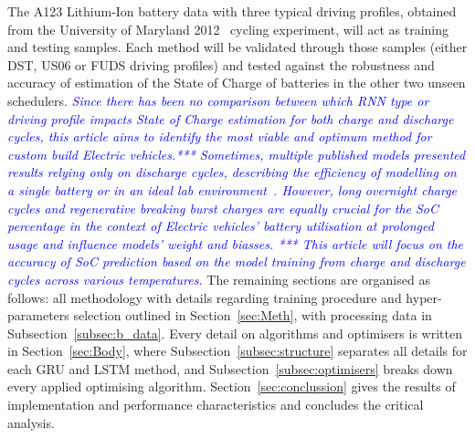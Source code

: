 The A123 Lithium-Ion battery data with three typical driving profiles, obtained from the University of Maryland 2012~\cite{noauthor_calce_2017} cycling experiment, will act as training and testing samples.
Each method will be validated through those samples (either DST, US06 or FUDS driving profiles) and tested against the robustness and accuracy of estimation of the State of Charge of batteries in the other two unseen schedulers.
\textcolor{blue}{\textit{
Since there has been no comparison between which RNN type or driving profile impacts State of Charge estimation for both charge and discharge cycles, this article aims to identify the most viable and optimum method for custom build Electric vehicles.***
Sometimes, multiple published models presented results relying only on discharge cycles, describing the efficiency of modelling on a single battery or in an ideal lab environment~\cite{xia_state_2018,javid_adaptive_2020,jiao_gru-rnn_2020,mamo_long_2020,zhang_deep_2020}.
However, long overnight charge cycles and regenerative breaking burst charges are equally crucial for the SoC percentage in the context of Electric vehicles' battery utilisation at prolonged usage and influence models' weight and biasses. ***
This article will focus on the accuracy of SoC prediction based on the model training from charge and discharge cycles across various temperatures.
}}
%
%
The remaining sections are organised as follows: all methodology with details regarding training procedure and hyper-parameters selection outlined in Section~\ref{sec:Meth}, with processing data in Subsection~\ref{subsec:b_data}.
Every detail on algorithms and optimisers is written in Section~\ref{sec:Body}, where Subsection~\ref{subsec:structure} separates all details for each GRU and LSTM method, and Subsection~\ref{subsec:optimisers} breaks down every applied optimising algorithm.
Section~\ref{sec:conclussion} gives the results of implementation and performance characteristics and concludes the critical analysis.
